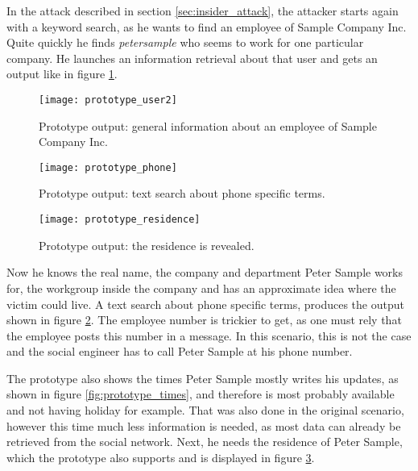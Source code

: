 In the attack described in section \ref{sec:insider_attack}, the attacker
starts again with a keyword search, as he wants to find an employee of Sample
Company Inc. Quite quickly he finds \textit{petersample} who seems to work for
one particular company. He launches an information retrieval about that user
and gets an output like in figure \ref{fig:prototype_user2}.

\begin{figure}[htb]
  \begin{center}
    \texttt{[image: prototype\_user2]}
    \caption{Prototype output: general information about an employee of Sample Company Inc.}
    \label{fig:prototype_user2}
  \end{center}
\end{figure}

\begin{figure}[htb]
  \begin{center}
    \texttt{[image: prototype\_phone]}
    \caption{Prototype output: text search about phone specific terms.}
    \label{fig:prototype_phone}
  \end{center}
\end{figure}

\begin{figure}[h!tb]
  \begin{center}
    \texttt{[image: prototype\_residence]}
    \caption{Prototype output: the residence is revealed.}
    \label{fig:prototype_residence}
  \end{center}
\end{figure}

Now he knows the real name, the company and department Peter Sample works for,
the workgroup inside the company and has an approximate idea where the victim
could live. A text search about phone specific terms, produces the output
shown in figure \ref{fig:prototype_phone}. The employee number is
trickier to get, as one must rely that the employee posts this number in a
message. In this scenario, this is not the case and the social engineer has to
call Peter Sample at his phone number.

The prototype also shows the times Peter Sample mostly writes his updates, as
shown in figure \ref{fig:prototype_times}, and therefore is most probably
available and not having holiday for example. That was also done in the
original scenario, however this time much less information is needed, as most
data can already be retrieved from the social network. Next, he needs the residence
of Peter Sample, which the prototype also supports and is displayed in figure
\ref{fig:prototype_residence}.

